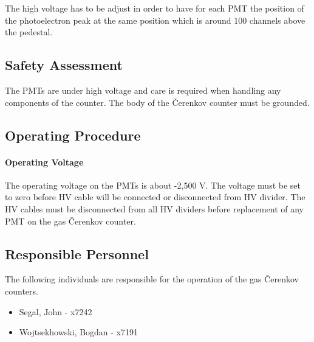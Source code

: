 The high voltage has to be adjust in order to have for each PMT 
the position of the photoelectron peak at the same position 
which is around 100 channels above the pedestal. 

\subsection{Safety Assessment}

\begin{safetyen}{10}{10}
The PMTs are under high voltage and care is required when handling any 
components of the counter. The body of the \v{C}erenkov counter must be grounded. 
\end{safetyen}

\subsection{Operating Procedure}

\paragraph{Operating Voltage}

\begin{safetyen}{10}{10}
The operating voltage on the PMTs is about -2,500 V. The voltage must be set to
zero before HV cable will be connected or disconnected from HV divider.
The HV cables must be disconnected from all HV dividers before replacement
of any PMT on the gas \v{C}erenkov counter. 
\end{safetyen}

\subsection{Responsible Personnel} 
The following individuals are responsible for the operation 
of the gas \v{C}erenkov counters.
 
\begin{itemize}
\item[~]Segal, John - x7242 
\item[~]Wojtsekhowski, Bogdan - x7191 
\end{itemize} 







